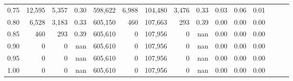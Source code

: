 \begin{tabular}{rrrrrrrrrrrrrrr}
0.75 &  12,595 &   5,357 &  0.30 &  598,622 &    6,988 &  104,480 &    3,476 &  0.33 &  0.03 &  0.06 &      0.01 \\
0.80 &   6,528 &   3,183 &  0.33 &  605,150 &      460 &  107,663 &      293 &  0.39 &  0.00 &  0.00 &      0.00 \\
0.85 &     460 &     293 &  0.39 &  605,610 &        0 &  107,956 &        0 &   nan &  0.00 &  0.00 &      0.00 \\
0.90 &       0 &       0 &   nan &  605,610 &        0 &  107,956 &        0 &   nan &  0.00 &  0.00 &      0.00 \\
0.95 &       0 &       0 &   nan &  605,610 &        0 &  107,956 &        0 &   nan &  0.00 &  0.00 &      0.00 \\
1.00 &       0 &       0 &   nan &  605,610 &        0 &  107,956 &        0 &   nan &  0.00 &  0.00 &      0.00 \\
\bottomrule
\end{tabular}
